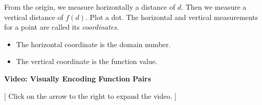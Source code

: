 \documentclass{ximera}
\begin{document}
From the origin, we measure horizontally a distance of $d$.  Then we measure a vertical distance of $f(d)$. Plot a dot. The horizontal and vertical measurements for a point are called its \textit{coordinates}.


\begin{itemize}
\item The horizontal coordinate is the domain number.
\item The vertical coordinate is the function value.
\end{itemize}





\begin{explanation} \textbf{Video: Visually Encoding Function Pairs}

[ Click on the arrow to the right to expand the video. ]
\begin{expandable} 

\begin{center}
\end{center}

\end{expandable}
\end{explanation}
\end{document}
